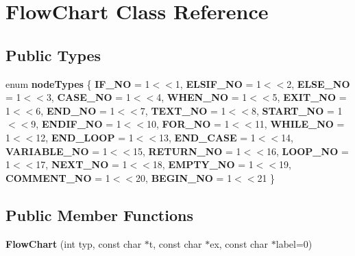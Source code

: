 \hypertarget{class_flow_chart}{}\section{Flow\+Chart Class Reference}
\label{class_flow_chart}
\subsection*{Public Types}
\begin{DoxyCompactItemize}
\item 
\mbox{\label{class_flow_chart_acd787d5c3faa541b938e0d58c800572c}} 
enum {\bfseries node\+Types} \{ \newline
{\bfseries I\+F\+\_\+\+NO} = 1$<$$<$1, 
{\bfseries E\+L\+S\+I\+F\+\_\+\+NO} = 1$<$$<$2, 
{\bfseries E\+L\+S\+E\+\_\+\+NO} = 1$<$$<$3, 
{\bfseries C\+A\+S\+E\+\_\+\+NO} = 1$<$$<$4, 
\newline
{\bfseries W\+H\+E\+N\+\_\+\+NO} = 1$<$$<$5, 
{\bfseries E\+X\+I\+T\+\_\+\+NO} = 1$<$$<$6, 
{\bfseries E\+N\+D\+\_\+\+NO} = 1$<$$<$7, 
{\bfseries T\+E\+X\+T\+\_\+\+NO} = 1$<$$<$8, 
\newline
{\bfseries S\+T\+A\+R\+T\+\_\+\+NO} = 1$<$$<$9, 
{\bfseries E\+N\+D\+I\+F\+\_\+\+NO} = 1$<$$<$10, 
{\bfseries F\+O\+R\+\_\+\+NO} = 1$<$$<$11, 
{\bfseries W\+H\+I\+L\+E\+\_\+\+NO} = 1$<$$<$12, 
\newline
{\bfseries E\+N\+D\+\_\+\+L\+O\+OP} = 1$<$$<$13, 
{\bfseries E\+N\+D\+\_\+\+C\+A\+SE} = 1$<$$<$14, 
{\bfseries V\+A\+R\+I\+A\+B\+L\+E\+\_\+\+NO} = 1$<$$<$15, 
{\bfseries R\+E\+T\+U\+R\+N\+\_\+\+NO} = 1$<$$<$16, 
\newline
{\bfseries L\+O\+O\+P\+\_\+\+NO} = 1$<$$<$17, 
{\bfseries N\+E\+X\+T\+\_\+\+NO} = 1$<$$<$18, 
{\bfseries E\+M\+P\+T\+Y\+\_\+\+NO} = 1$<$$<$19, 
{\bfseries C\+O\+M\+M\+E\+N\+T\+\_\+\+NO} = 1$<$$<$20, 
\newline
{\bfseries B\+E\+G\+I\+N\+\_\+\+NO} = 1$<$$<$21
 \}
\end{DoxyCompactItemize}
\subsection*{Public Member Functions}
\begin{DoxyCompactItemize}
\item 
\mbox{\label{class_flow_chart_a70ab6bce44390f5369924c1397b81299}} 
{\bfseries Flow\+Chart} (int typ, const char $\ast$t, const char $\ast$ex, const char $\ast$label=0)
\end{DoxyCompactItemize}
